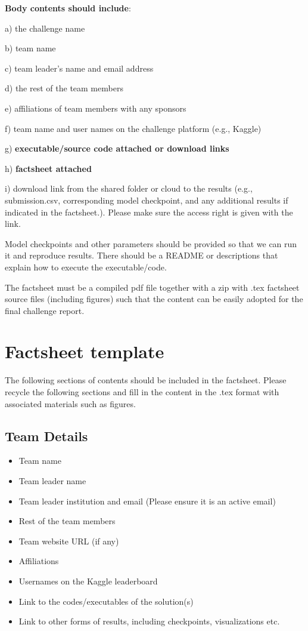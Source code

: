 \documentclass{article}
\begin{document}
\textbf{Body contents should include}: 

a) the challenge name 

b) team name 

c) team leader's name and email address 

d) the rest of the team members 

e) affiliations of team members with any sponsors 

f) team name and user names on the challenge platform (e.g., Kaggle) 

g) \textbf{executable/source code attached or download links}

h) \textbf{factsheet attached} 

i) download link from the shared folder or cloud to the results (e.g., submission.csv, corresponding model checkpoint, and any additional results if indicated in the factsheet.). Please make sure the access right is given with the link.

Model checkpoints and other parameters should be provided so that we can run it and reproduce results. There should be a README or descriptions that explain how to execute the executable/code. 

The factsheet must be a compiled pdf file together with a zip with .tex factsheet source files (including figures) such that the content can be easily adopted for the final challenge report. 


\section{Factsheet template}
The following sections of contents should be included in the factsheet. Please recycle the following sections and fill in the content in the .tex format with associated materials such as figures.

\subsection{Team Details}

\begin{itemize}
    \item Team name
    \item Team leader name
    \item Team leader institution and email (Please ensure it is an active email)
    \item Rest of the team members
    \item Team website URL (if any)
    \item Affiliations
    \item Usernames on the Kaggle leaderboard 
    \item Link to the codes/executables of the solution(s)
    \item Link to other forms of results, including checkpoints, visualizations etc.
\end{itemize}
\end{document}
